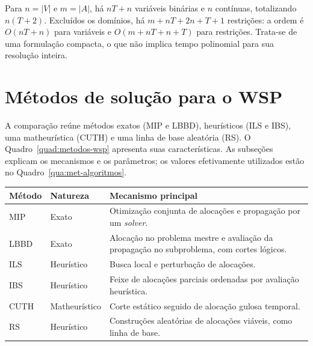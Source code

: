 Para $n=|V|$ e $m=|A|$, há $nT+n$ variáveis binárias e $n$ contínuas,
totalizando $n(T+2)$. Excluídos os domínios, há
$m+nT+2n+T+1$ restrições: a ordem é $O(nT+n)$ para variáveis e
$O(m+nT+n+T)$ para restrições. Trata-se de uma formulação compacta,
o que não implica tempo polinomial para sua resolução inteira.

\section{Métodos de solução para o WSP}\label{sec:metodos-wsp}

A comparação reúne métodos exatos (MIP e LBBD), heurísticos (ILS e IBS),
uma matheurística (CUTH) e uma linha de base aleatória (RS).
O Quadro~\ref{quad:metodos-wsp} apresenta suas características.
As subseções explicam os mecanismos e os parâmetros; os valores efetivamente
utilizados estão no Quadro~\ref{qua:met-algoritmos}.

\begin{quadro}[htbp]
\centering
\caption{Abordagens consideradas para o WSP.}\label{quad:metodos-wsp}
\begin{singlespace}
\begin{tabular}{|p{1.4cm}|p{2.4cm}|p{8.4cm}|}
\hline
Método & Natureza & Mecanismo principal\\ \hline
MIP & Exato & Otimização conjunta de alocações e propagação por um \textit{solver}.\\ \hline
LBBD & Exato & Alocação no problema mestre e avaliação da propagação no subproblema, com cortes lógicos.\\ \hline
ILS & Heurístico & Busca local e perturbação de alocações.\\ \hline
IBS & Heurístico & Feixe de alocações parciais ordenadas por avaliação heurística.\\ \hline
CUTH & Matheurístico & Corte estático seguido de alocação gulosa temporal.\\ \hline
RS & Heurístico & Construções aleatórias de alocações viáveis, como linha de base.\\ \hline
\end{tabular}
\par\smallskip
{}
\end{singlespace}
\end{quadro}

